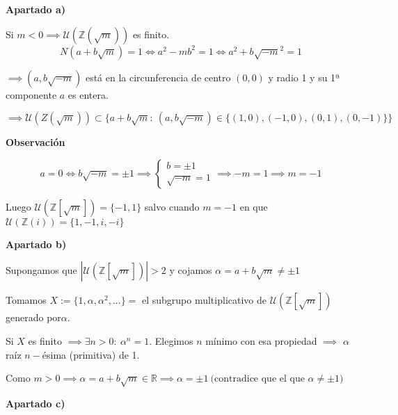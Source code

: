 \documentclass[openany]{book}
\begin{document}
\begin{exercise}
    $  $
    \begin{flushright}
        \textbf{Apartado a)}
    \end{flushright}
    Si $ m<0 \implies \mathcal{U}(\mathbb{Z}(\sqrt{m}))$ es finito. 
    $$ N(a+b\sqrt{m}) = 1\iff a^2-mb^2 = 1 \iff a^2+b\sqrt{-m}^2 = 1 $$

    $ \implies (a,b\sqrt{-m}) $ está en la circunferencia de centro $ (0,0) $ y radio 1 y su 1ª componente $ a $ es entera.

    $$ \implies \mathcal{U}(Z(\sqrt{m})) \subset  \{a+b\sqrt{m}:\ (a,b\sqrt{-m}) \in \{(1,0),(-1,0),(0,1),(0,-1)\}\} $$

    \begin{flushright}
        \textbf{Observación}

    \end{flushright}

    $$ a = 0\iff b\sqrt{-m} = \pm 1 \implies \left\{
    \begin{array}{l}
        b = \pm 1\\ \sqrt{-m} = 1
    \end{array}
    \right. 
    \implies -m = 1 \implies m = -1 $$

    Luego $ \mathcal{U}(\mathbb{Z}[\sqrt{m}]) = \{-1,1\} $ salvo cuando $ m = -1 $ en que $ \mathcal{U}(\mathbb{Z}(i)) = \{1,-1,i,-i\} $


    \begin{flushright}
        \textbf{Apartado b)}
    \end{flushright}
    

    Supongamos que $ |\mathcal{U}(\mathbb{Z}[\sqrt{m}]) | > 2 $ y cojamos $ \alpha = a +b\sqrt{m} \ne \pm 1 $

    Tomamos $X:= \{1,\alpha,\alpha^2,...\} =  $ el subgrupo multiplicativo de $ \mathcal{U}(\mathbb{Z}[\sqrt{m}])$ generado por$ \alpha $.

    Si $ X $ es finito $ \implies \exists n > 0 :\ \alpha ^{n} = 1 $. Elegimos $ n $ mínimo con esa propiedad $  \implies  $ $ \alpha  $ raíz $ n- $ésima (primitiva)  de 1.

    Como $ m > 0 \implies \alpha = a+b\sqrt{m} \in \mathbb{R} \implies  \alpha = \pm 1\ \text{(contradice que el que }\alpha \ne \pm 1) $

    \begin{flushright}
        \textbf{Apartado c)}
    \end{flushright}
    

\end{exercise}
\end{document}
